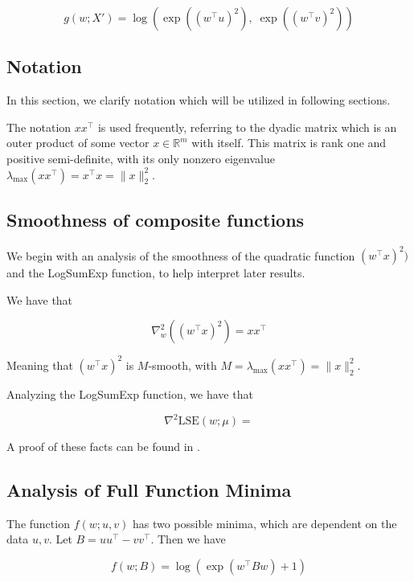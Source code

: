 \documentclass[11pt]{article}
\begin{document}
\begin{equation}
    g(w; X') = \log(\exp((w^{\top} u)^2), \; \exp((w^{\top} v)^2))
\end{equation}

\subsection{Notation}

In this section, we clarify notation which will be utilized in following sections.

The notation $xx^{\top}$ is used frequently, referring to the dyadic matrix which is an outer product of some vector $x \in \mathbb{R}^m$ with itself. This matrix is rank one and positive semi-definite, with its only nonzero eigenvalue $\lambda_{\max}(xx^{\top}) = x^{\top}x = \|x\|_2^2$.

\subsection{Smoothness of composite functions}

We begin with an analysis of the smoothness of the quadratic function $(w^{\top} x)^2)$ and the LogSumExp function, to help interpret later results.

We have that

\begin{equation}
    \nabla_w^2 ((w^{\top} x)^2) = xx^{\top}
\end{equation}

Meaning that $(w^{\top} x)^2$ is $M$-smooth, with $M = \lambda_{\max}(xx^{\top}) = \|x\|_2^2$.

Analyzing the LogSumExp function, we have that

\begin{equation}
    \nabla^2 \textrm{LSE}(w; \mu) = 
\end{equation}

A proof of these facts can be found in \cite{gao_properties_2018}.

\subsection{Analysis of Full Function Minima}

The function $f(w; u, v)$ has two possible minima, which are dependent on the data $u, v$. Let $B = uu^{\top} - vv^{\top}$. Then we have

\begin{equation}
    f(w; B) = \log(\exp(w^{\top}Bw) + 1)
\end{equation}
\end{document}
